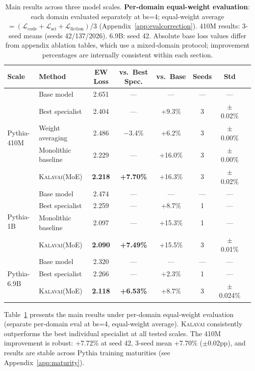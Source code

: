 \documentclass{article}
\newcommand{\kalavai}{\textsc{Kalavai}\xspace}
\begin{document}
\begin{table}[t]
\centering
\caption{Main results across three model scales. \textbf{Per-domain equal-weight evaluation}: each domain evaluated separately at bs=4; equal-weight average $= (\mathcal{L}_\text{code} + \mathcal{L}_\text{sci} + \mathcal{L}_\text{fiction})/3$ (Appendix~\ref{app:evalcorrection}). 410M results: 3-seed means (seeds 42/137/2026). 6.9B: seed 42. Absolute base loss values differ from appendix ablation tables, which use a mixed-domain protocol; improvement percentages are internally consistent within each section.}
\label{tab:main}
\begin{tabular}{llcccccc}
\toprule
\textbf{Scale} & \textbf{Method} & \textbf{EW Loss} & \textbf{vs.\ Best Spec.} & \textbf{vs.\ Base} & \textbf{Seeds} & \textbf{Std} \\
\midrule
\multirow{5}{*}{Pythia-410M}
 & Base model          & 2.651 & ---     & ---     & ---  & ---       \\
 & Best specialist     & 2.404 & ---     & +9.3\%  & 3    & $\pm$0.02\% \\
 & Weight averaging    & 2.486 & $-$3.4\% & +6.2\% & 3    & $\pm$0.00\% \\
 & Monolithic baseline & 2.229 & ---     & +16.0\% & 3    & $\pm$0.00\% \\
 & \kalavai (MoE)      & \textbf{2.218} & \textbf{+7.70\%} & +16.3\% & 3 & $\pm$0.02\% \\
\midrule
\multirow{4}{*}{Pythia-1B}
 & Base model          & 2.474 & ---     & ---     & ---  & ---        \\
 & Best specialist     & 2.259 & ---     & +8.7\%  & 1    & ---        \\
 & Monolithic baseline & 2.097 & ---     & +15.3\% & 1    & ---        \\
 & \kalavai (MoE)      & \textbf{2.090} & \textbf{+7.49\%} & +15.5\% & 3 & $\pm$0.01\% \\
\midrule
\multirow{3}{*}{Pythia-6.9B}
 & Base model          & 2.320 & ---     & ---     & ---  & ---        \\
 & Best specialist     & 2.266 & ---     & +2.3\%  & 1    & ---        \\
 & \kalavai (MoE)      & \textbf{2.118} & \textbf{+6.53\%} & +8.7\%  & 3 & $\pm$0.024\% \\
\bottomrule
\end{tabular}
\end{table}

Table~\ref{tab:main} presents the main results under per-domain equal-weight evaluation (separate per-domain eval at bs=4, equal-weight average). \kalavai consistently outperforms the best individual specialist at all tested scales. The 410M improvement is robust: +7.72\% at seed 42, 3-seed mean +7.70\% ($\pm$0.02pp), and results are stable across Pythia training maturities (see Appendix~\ref{app:maturity}).
\end{document}
